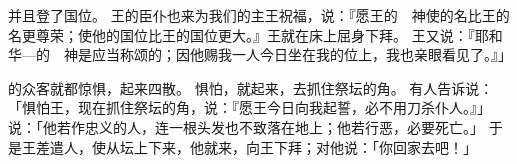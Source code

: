 {并且{}登了国位。
王的臣仆也来为我们的主{}王祝福，说：『愿王的　神使{}的名比王的名更尊荣；使他的国位比王的国位更大。』王就在床上屈身下拜。
王又说：『耶和华—{}的　神是应当称颂的；因他赐我一人今日坐在我的位上，我也亲眼看见了。』」
\par }{\PP {}的众客{}就都惊惧，起来四散。
惧怕{}，就起来，去抓住祭坛的角。
有人告诉{}说：「{}惧怕{}王，现在抓住祭坛的角，说：『愿{}王今日向我起誓，必不用刀杀仆人。』」
说：「他若作忠义的人，连一根头发也不致落在地上；他若行恶，必要死亡。」
于是{}王差遣人，使{}从坛上下来，他就来，向{}王下拜；{}对他说：「你回家去吧！」

}
